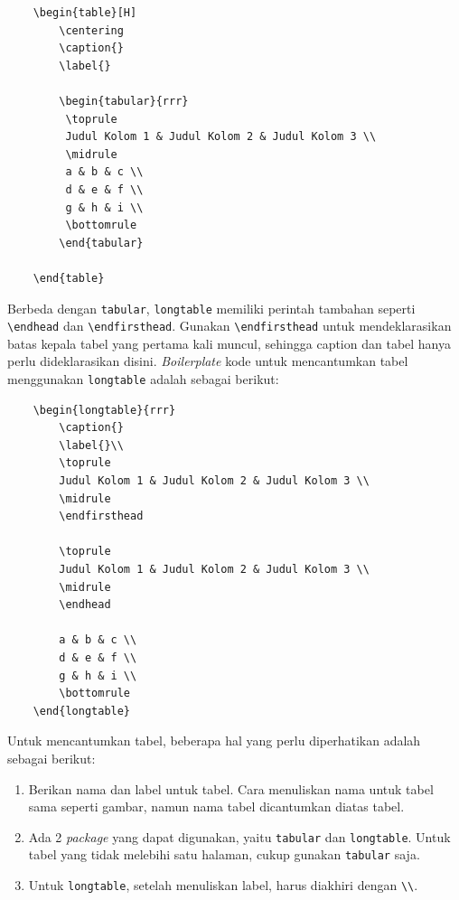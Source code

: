 \begin{verbatim}
    \begin{table}[H]
        \centering
        \caption{}
        \label{}
        
        \begin{tabular}{rrr}
         \toprule
         Judul Kolom 1 & Judul Kolom 2 & Judul Kolom 3 \\
         \midrule
         a & b & c \\
         d & e & f \\
         g & h & i \\
         \bottomrule
        \end{tabular}

    \end{table}
\end{verbatim}

Berbeda dengan \texttt{tabular}, \texttt{longtable} memiliki perintah tambahan seperti \verb|\endhead| dan \verb|\endfirsthead|. Gunakan \verb|\endfirsthead| untuk mendeklarasikan batas kepala tabel yang pertama kali muncul, sehingga caption dan tabel hanya perlu dideklarasikan disini. \textit{Boilerplate} kode untuk mencantumkan tabel menggunakan \texttt{longtable} adalah sebagai berikut:

\begin{verbatim}
    \begin{longtable}{rrr}
        \caption{}
        \label{}\\
        \toprule
        Judul Kolom 1 & Judul Kolom 2 & Judul Kolom 3 \\
        \midrule
        \endfirsthead
    
        \toprule
        Judul Kolom 1 & Judul Kolom 2 & Judul Kolom 3 \\
        \midrule
        \endhead
        
        a & b & c \\
        d & e & f \\
        g & h & i \\
        \bottomrule
    \end{longtable}
\end{verbatim}

Untuk mencantumkan tabel, beberapa hal yang perlu diperhatikan adalah sebagai berikut:

\begin{enumerate}
    \item Berikan nama dan label untuk tabel. Cara menuliskan nama untuk tabel sama seperti gambar, namun nama tabel dicantumkan diatas tabel. 
    \item Ada 2 \textit{package} yang dapat digunakan, yaitu \texttt{tabular} dan \texttt{longtable}. Untuk tabel yang tidak melebihi satu halaman, cukup gunakan \texttt{tabular} saja.
    \item Untuk \texttt{longtable}, setelah menuliskan label, harus diakhiri dengan \verb|\\|.
\end{enumerate}

